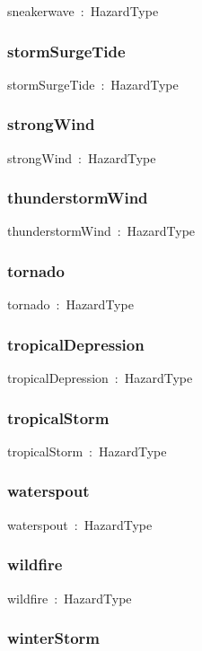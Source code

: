\documentclass{article}
\begin{document}
sneakerwave~:~HazardType

\subsubsection*{stormSurgeTide}

stormSurgeTide~:~HazardType

\subsubsection*{strongWind}

strongWind~:~HazardType

\subsubsection*{thunderstormWind}

thunderstormWind~:~HazardType

\subsubsection*{tornado}

tornado~:~HazardType

\subsubsection*{tropicalDepression}

tropicalDepression~:~HazardType

\subsubsection*{tropicalStorm}

tropicalStorm~:~HazardType

\subsubsection*{waterspout}

waterspout~:~HazardType

\subsubsection*{wildfire}

wildfire~:~HazardType

\subsubsection*{winterStorm}
\end{document}
